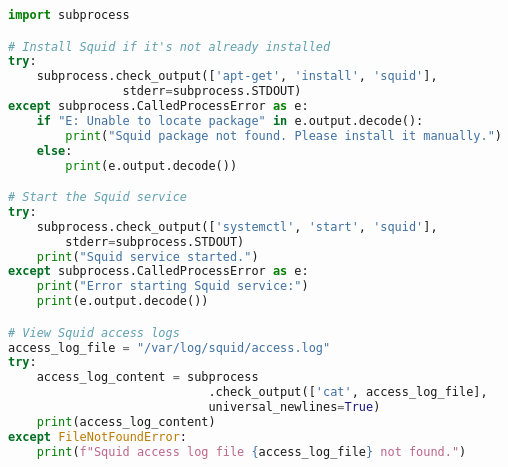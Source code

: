 \documentclass{VUMIFPSmagistrinis}
\begin{document}
\begin{lstlisting}[language=Python]
import subprocess

# Install Squid if it's not already installed
try:
    subprocess.check_output(['apt-get', 'install', 'squid'], 
                stderr=subprocess.STDOUT)
except subprocess.CalledProcessError as e:
    if "E: Unable to locate package" in e.output.decode():
        print("Squid package not found. Please install it manually.")
    else:
        print(e.output.decode())

# Start the Squid service
try:
    subprocess.check_output(['systemctl', 'start', 'squid'], 
        stderr=subprocess.STDOUT)
    print("Squid service started.")
except subprocess.CalledProcessError as e:
    print("Error starting Squid service:")
    print(e.output.decode())

# View Squid access logs
access_log_file = "/var/log/squid/access.log"
try:
    access_log_content = subprocess
                            .check_output(['cat', access_log_file], 
                            universal_newlines=True)
    print(access_log_content)
except FileNotFoundError:
    print(f"Squid access log file {access_log_file} not found.")
\end{lstlisting}


	

	






		
\pagebreak
\printbibliography[heading=bibintoc] 
\end{document}
